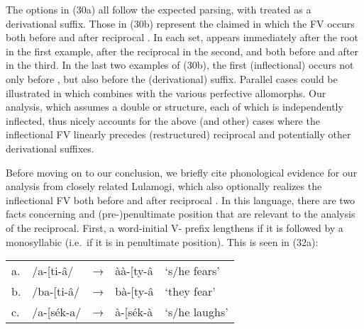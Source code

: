 \documentclass[output=paper,
modfonts
]{LSP/langsci}
\begin{document}
\noindent The options in (30a) all follow the expected parsing, with 
treated as a derivational suffix. Those in (30b) represent the claimed
 in which the FV  occurs both before and after
reciprocal . In each set,   appears
immediately after the root in the first example, after the reciprocal in
the second, and both before and after in the third. In the last two
examples of (30b), the first (inflectional)  occurs not only
before , but also before the (derivational) 
 suffix. Parallel cases could be illustrated in which
 combines with the various perfective allomorphs. Our
analysis, which assumes a double or   structure, each of
which is independently inflected, thus nicely accounts for the above
(and other) cases where the inflectional FV linearly precedes
(restructured) reciprocal  and potentially other
derivational suffixes.

\ea
{}
\z

Before moving on to our conclusion, we briefly cite phonological
evidence for our analysis from closely related Lulamogi, which also
optionally realizes the inflectional FV both before and after reciprocal
 \citep{hymaninpress}. In this language, there are two facts
concerning  and (pre-)penultimate position that are relevant
to the analysis of the reciprocal. First, a word-initial V- prefix
lengthens if it is followed by a monosyllabic  (i.e.\ if it is in
penultimate position). This is seen in (32a):

\ea\begin{tabular}[t]{@{}lllll}
a. & /a-{[}ti-â/ & → & àà-{[}ty-â & `s/he fears' \\
b. & /ba-{[}ti-â/ & → & bà-{[}ty-â & `they fear' \\
c. & /a-{[}sék-a/ & → & à-{[}sék-à & `s/he laughs'
\end{tabular}
\z
\end{document}
